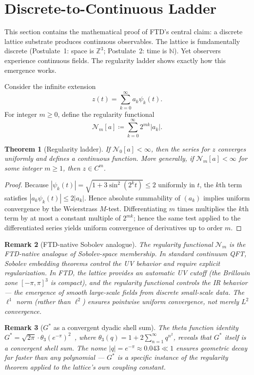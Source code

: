 \documentclass[11pt]{article}
\theoremstyle{tight}
\newtheorem{theorem}{Theorem}[section]
\theoremstyle{plainroman}
\newtheorem{remark}[theorem]{Remark}
\newcommand{\Z}{\mathbb{Z}}
\newcommand{\N}{\mathbb{N}}
\newcommand{\Nreg}{\mathcal{N}}
\begin{document}
\section{Discrete-to-Continuous Ladder}

This section contains the mathematical proof of FTD's central claim: a discrete lattice substrate produces continuous observables.
The lattice is fundamentally discrete (Postulate~1: space is $\Z^3$; Postulate~2: time is $\N$).
Yet observers experience continuous fields.
The regularity ladder shows exactly how this emergence works.

Consider the infinite extension
\[
z(t)=\sum_{k=0}^{\infty} a_k\psi_k(t).
\]
For integer $m\ge 0$, define the regularity functional
\[
\Nreg_m[a]\coloneqq \sum_{k=0}^{\infty} 2^{mk}|a_k|.
\]
\begin{theorem}[Regularity ladder]
If $\Nreg_0[a]<\infty$, then the series for $z$ converges uniformly and defines a continuous function.
More generally, if $\Nreg_m[a]<\infty$ for some integer $m\ge 1$, then $z\in C^m$.
\end{theorem}
\begin{proof}
Because $|\psi_k(t)|=\sqrt{1+3\sin^2(2^k t)}\le 2$ uniformly in $t$, the $k$th term satisfies $|a_k\psi_k(t)|\le 2|a_k|$.
Hence absolute summability of $(a_k)$ implies uniform convergence by the Weierstrass $M$-test.
Differentiating $m$ times multiplies the $k$th term by at most a constant multiple of $2^{mk}$;
hence the same test applied to the differentiated series yields uniform convergence of derivatives up to order $m$.
\end{proof}

\begin{remark}[FTD-native Sobolev analogue]
The regularity functional $\Nreg_m$ is the FTD-native analogue of Sobolev-space membership.
In standard continuum QFT, Sobolev embedding theorems control the UV behavior and require explicit regularization.
In FTD, the lattice provides an automatic UV cutoff (the Brillouin zone $[-\pi,\pi]^3$ is compact), and the regularity functional controls the IR behavior --- the emergence of smooth large-scale fields from discrete small-scale data.
The $\ell^1$ norm (rather than $\ell^2$) ensures pointwise uniform convergence, not merely $L^2$ convergence.
\end{remark}

\begin{remark}[$G^*$ as a convergent dyadic shell sum]
The theta function identity $G^*=\sqrt{2\pi}\cdot\theta_3(e^{-\pi})^2$~\cite{ftdbridge}, where $\theta_3(q)=1+2\sum_{n=1}^\infty q^{n^2}$, reveals that $G^*$ itself is a convergent shell sum.
The nome $|q|=e^{-\pi}\approx 0.043\ll 1$ ensures geometric decay far faster than any polynomial --- $G^*$ is a specific instance of the regularity theorem applied to the lattice's own coupling constant.
\end{remark}
\end{document}
